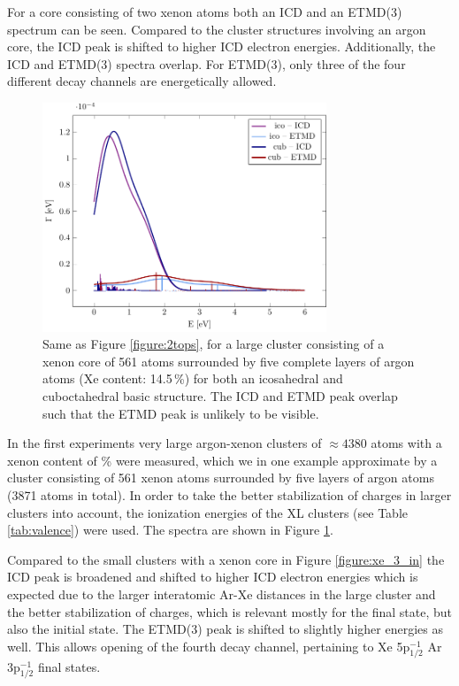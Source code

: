 For a core consisting of two xenon atoms both an ICD and an ETMD(3) spectrum
can be seen. Compared to the cluster structures involving an argon core, the ICD peak is
shifted to higher ICD electron energies. 
Additionally, the ICD and ETMD(3) spectra overlap.
For ETMD(3), only three of the four different decay channels are
energetically allowed.

\begin{figure}[ht]
 \centering
 \includegraphics[width=8.5cm]{pics/c6l5.pdf}
 \caption{Same as Figure \protect\ref{figure:2tops},
          for a large cluster consisting
          of a xenon core of 561 atoms surrounded by five complete layers of
          argon atoms (Xe content: 14.5\,\%) for both an icosahedral and
          cuboctahedral basic structure.
          The ICD and ETMD peak overlap such that the ETMD peak
          is unlikely to be visible.}
 \label{figure:xe_6_lay5}
\end{figure}
%
In the first experiments very large argon-xenon clusters of 
$\approx 4380$ atoms with a xenon content of \unit[19]{\%}
were measured,\cite{Mucke_phd}
which we in one example approximate by a cluster consisting of 561 xenon
atoms surrounded
by five layers of argon atoms (3871 atoms in total). In order to take the
better stabilization of charges in larger clusters into account, the
ionization energies of the XL clusters (see Table \ref{tab:valence})
were used.
The spectra are shown in 
Figure \ref{figure:xe_6_lay5}.

Compared to the small clusters with a xenon core in Figure \ref{figure:xe_3_in}
the ICD peak is broadened and shifted to higher ICD electron energies which is
expected due to the larger interatomic Ar-Xe distances in the large cluster and
the better stabilization of charges, which is relevant mostly for the final state, but also the initial state.
The ETMD(3) peak is shifted to slightly higher energies as well. This allows opening of the
fourth decay channel, pertaining to Xe 5p$_{1/2}^{-1}$ Ar 3p$_{1/2}^{-1}$ final states.

